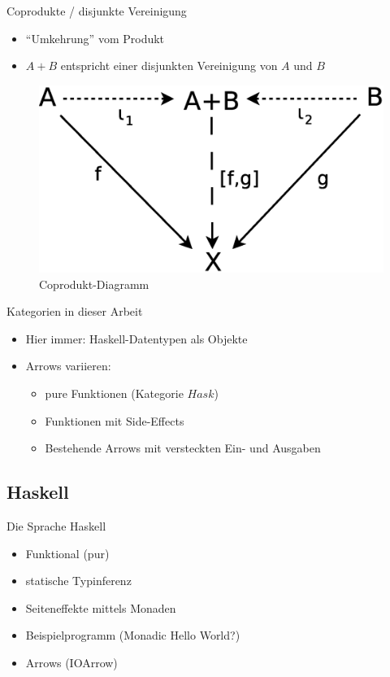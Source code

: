 \documentclass{beamer}
\begin{document}
\begin{frame}{Coprodukte / disjunkte Vereinigung}
  \begin{itemize}
  \item "`Umkehrung"' vom Produkt
  \item $A + B$ entspricht einer disjunkten Vereinigung von $A$ und $B$
  \end{itemize}
  \begin{figure}
    \centering
    \includegraphics[scale=0.3]{images/cat_coproduct}
    \caption{Coprodukt-Diagramm}
  \end{figure}
\end{frame}

\begin{frame}{Kategorien in dieser Arbeit}
  \begin{itemize}
  \item Hier immer: Haskell-Datentypen als Objekte
  \item Arrows variieren:
    \begin{itemize}
    \item pure Funktionen (Kategorie $Hask$)
    \item Funktionen mit Side-Effects
    \item Bestehende Arrows mit versteckten Ein- und Ausgaben
    \end{itemize}
  \end{itemize}
\end{frame}

\subsection{Haskell}

\begin{frame}{Die Sprache Haskell}
  \begin{itemize}
  \item Funktional (pur)
  \item statische Typinferenz
  \item Seiteneffekte mittels Monaden
  \item Beispielprogramm (Monadic Hello World?)
  \item Arrows (IOArrow)
  \end{itemize}
\end{frame}
\end{document}
